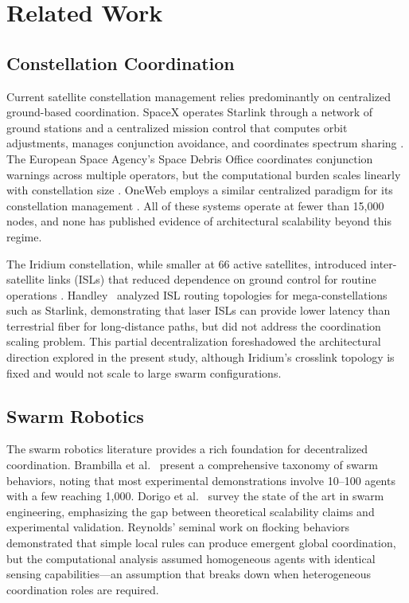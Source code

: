 \documentclass[journal]{IEEEtran}
\begin{document}
\section{Related Work}

\subsection{Constellation Coordination}

Current satellite constellation management relies predominantly on centralized ground-based coordination. SpaceX operates Starlink through a network of ground stations and a centralized mission control that computes orbit adjustments, manages conjunction avoidance, and coordinates spectrum sharing \cite{starlink_ops}. The European Space Agency's Space Debris Office coordinates conjunction warnings across multiple operators, but the computational burden scales linearly with constellation size \cite{esa_conjunction}. OneWeb employs a similar centralized paradigm for its constellation management \cite{oneweb_mgmt}. All of these systems operate at fewer than 15{,}000 nodes, and none has published evidence of architectural scalability beyond this regime.

The Iridium constellation, while smaller at 66 active satellites, introduced inter-satellite links (ISLs) that reduced dependence on ground control for routine operations \cite{iridium_arch}. Handley~\cite{handley_2018} analyzed ISL routing topologies for mega-constellations such as Starlink, demonstrating that laser ISLs can provide lower latency than terrestrial fiber for long-distance paths, but did not address the coordination scaling problem. This partial decentralization foreshadowed the architectural direction explored in the present study, although Iridium's crosslink topology is fixed and would not scale to large swarm configurations.

\subsection{Swarm Robotics}

The swarm robotics literature provides a rich foundation for decentralized coordination. Brambilla et al.~\cite{brambilla_2013} present a comprehensive taxonomy of swarm behaviors, noting that most experimental demonstrations involve 10--100 agents with a few reaching 1{,}000. Dorigo et al.~\cite{dorigo_2021} survey the state of the art in swarm engineering, emphasizing the gap between theoretical scalability claims and experimental validation. Reynolds' seminal work on flocking behaviors \cite{reynolds_1987} demonstrated that simple local rules can produce emergent global coordination, but the computational analysis assumed homogeneous agents with identical sensing capabilities---an assumption that breaks down when heterogeneous coordination roles are required.
\end{document}
